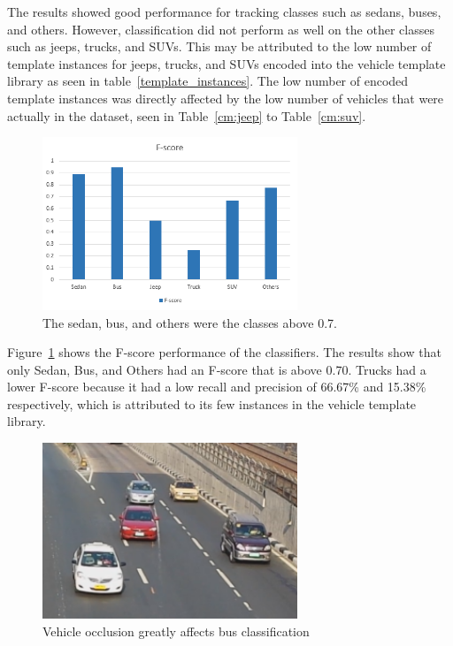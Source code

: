 \documentclass[conference]{IEEEtran}
\begin{document}
The results showed good performance for tracking classes such as sedans, buses, and others. However, classification did not perform as well on the other classes such as jeeps, trucks, and SUVs. This may be attributed to the low number of template instances for jeeps, trucks, and SUVs encoded into the vehicle template library as seen in table~\ref{template_instances}. The low number of encoded template instances was directly affected by the low number of vehicles that were actually in the dataset, seen in Table~\ref{cm:jeep} to Table~\ref{cm:suv}.

\begin{figure}[!ht]
\centering
\includegraphics[width=3in]{Fscore.png}
\caption{The sedan, bus, and others were the classes above 0.7.}
\label{fig_fscore_performance}
\end{figure}

Figure~\ref{fig_fscore_performance} shows the F-score performance of the classifiers. The results show that only Sedan, Bus, and Others had an F-score that is above 0.70. Trucks had a lower F-score because it had a low recall and precision of 66.67\% and 15.38\% respectively, which is attributed to its few instances in the vehicle template library. 

\begin{figure}[!ht]
\centering
\includegraphics[width=3in]{occlusion.png}
\caption{Vehicle occlusion greatly affects bus classification}
\label{fig_occlusion}
\end{figure}
\end{document}
